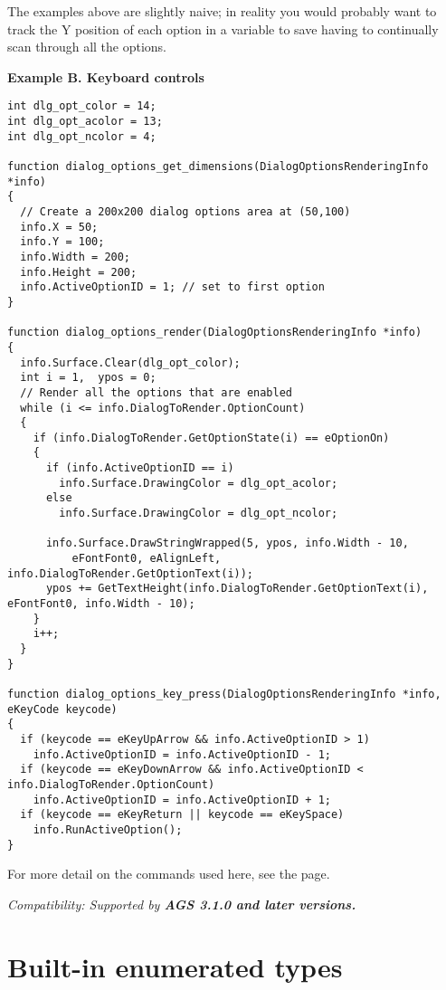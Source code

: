 The examples above are slightly naive; in reality you would probably want to track
the Y position of each option in a variable to save having to continually scan through
all the options.


\bf{Example B. Keyboard controls}

\begin{verbatim}
int dlg_opt_color = 14;
int dlg_opt_acolor = 13;
int dlg_opt_ncolor = 4;

function dialog_options_get_dimensions(DialogOptionsRenderingInfo *info)
{
  // Create a 200x200 dialog options area at (50,100)
  info.X = 50;
  info.Y = 100;
  info.Width = 200;
  info.Height = 200;
  info.ActiveOptionID = 1; // set to first option
}

function dialog_options_render(DialogOptionsRenderingInfo *info)
{
  info.Surface.Clear(dlg_opt_color);
  int i = 1,  ypos = 0;
  // Render all the options that are enabled
  while (i <= info.DialogToRender.OptionCount)
  {
    if (info.DialogToRender.GetOptionState(i) == eOptionOn)
    {
      if (info.ActiveOptionID == i)
        info.Surface.DrawingColor = dlg_opt_acolor;
      else
        info.Surface.DrawingColor = dlg_opt_ncolor;

      info.Surface.DrawStringWrapped(5, ypos, info.Width - 10, 
          eFontFont0, eAlignLeft, info.DialogToRender.GetOptionText(i));
      ypos += GetTextHeight(info.DialogToRender.GetOptionText(i), eFontFont0, info.Width - 10);
    }
    i++;
  }
}

function dialog_options_key_press(DialogOptionsRenderingInfo *info, eKeyCode keycode) 
{
  if (keycode == eKeyUpArrow && info.ActiveOptionID > 1)
    info.ActiveOptionID = info.ActiveOptionID - 1;
  if (keycode == eKeyDownArrow && info.ActiveOptionID < info.DialogToRender.OptionCount)
    info.ActiveOptionID = info.ActiveOptionID + 1;
  if (keycode == eKeyReturn || keycode == eKeySpace)
    info.RunActiveOption();
}
\end{verbatim}

For more detail on the commands used here, see the 
page.

\it{Compatibility:} Supported by \bf{AGS 3.1.0} and later versions.



\section{Built-in enumerated types}\label{BuiltInEnums}%

